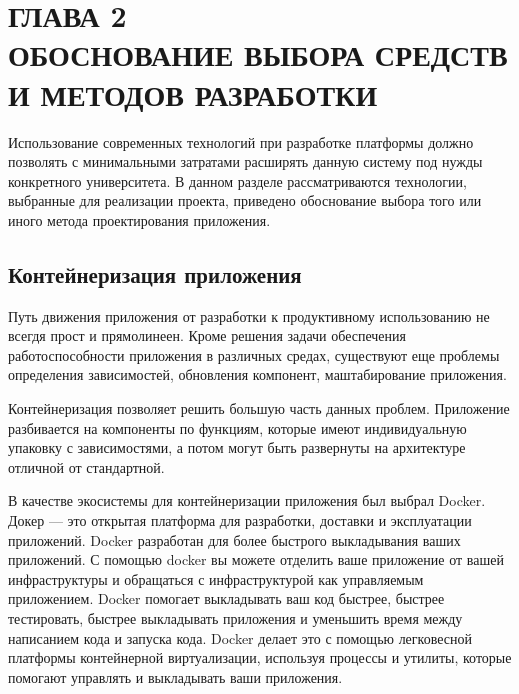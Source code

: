 \section*{ГЛАВА 2\\ ОБОСНОВАНИЕ ВЫБОРА СРЕДСТВ И МЕТОДОВ РАЗРАБОТКИ}
\setcounter{section}{2}\setcounter{subsection}{0}


Использование современных технологий при разработке платформы должно позволять
с минимальными затратами расширять данную систему под нужды конкретного университета.
В данном разделе рассматриваются технологии, выбранные для реализации проекта,
приведено обоснование выбора того или иного метода проектирования приложения.

\subsection{Контейнеризация приложения}

Путь движения приложения от разработки к продуктивному использованию не всегдя прост и
прямолинеен. Кроме решения задачи обеспечения работоспособности приложения в различных
средах, существуют еще проблемы определения зависимостей, обновления компонент,
маштабирование приложения.

Контейнеризация позволяет решить большую часть данных проблем. Приложение разбивается
на компоненты по функциям, которые имеют индивидуальную упаковку с зависимостями,
а потом могут быть развернуты на архитектуре отличной от стандартной.

В качестве экосистемы для контейнеризации приложения был выбрал Docker. Докер — это открытая
платформа для разработки, доставки и эксплуатации приложений. Docker разработан для более
быстрого выкладывания ваших приложений. С помощью docker вы можете отделить ваше приложение
от вашей инфраструктуры и обращаться с инфраструктурой как управляемым приложением.
Docker помогает выкладывать ваш код быстрее, быстрее тестировать, быстрее выкладывать
приложения и уменьшить время между написанием кода и запуска кода. Docker делает
это с помощью легковесной платформы контейнерной виртуализации, используя процессы и
утилиты, которые помогают управлять и выкладывать ваши приложения.

